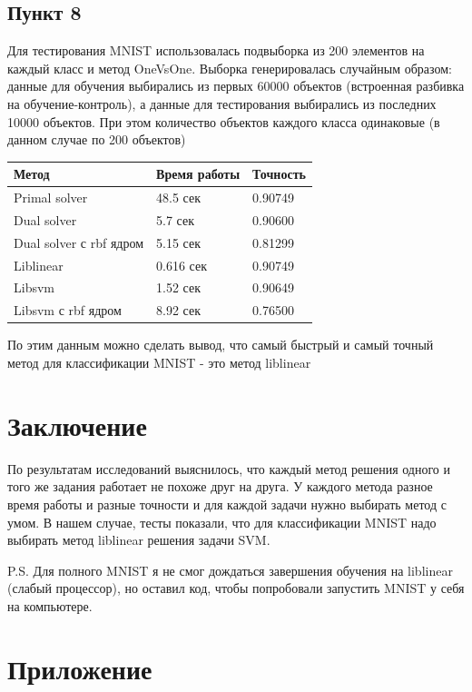 \documentclass[12pt, a4paper]{article}
\begin{document}
		\newpage
		\subsection{Пункт 8}
			Для тестирования MNIST использовалась подвыборка из 200 элементов на каждый класс и метод OneVsOne. Выборка генерировалась случайным образом: данные для обучения выбирались из первых 60000 объектов (встроенная разбивка на обучение-контроль), а данные для тестирования выбирались из последних 10000 объектов. При этом количество объектов каждого класса одинаковые (в данном случае по 200 объектов)

			\begin{center}
			\begin{tabular}{| l | l | l |}
				\hline
				Метод & Время работы & Точность \\
				\hline
				Primal solver & 48.5 сек & 0.90749 \\
				\hline
				Dual solver & 5.7 сек & 0.90600 \\
				\hline
				Dual solver с rbf ядром & 5.15 сек & 0.81299 \\
				\hline
				Liblinear & 0.616 сек & 0.90749 \\
				\hline
				Libsvm & 1.52 сек & 0.90649 \\
				\hline
				Libsvm с rbf ядром & 8.92 сек & 0.76500 \\
				\hline
			\end{tabular}
			\end{center}

			По этим данным можно сделать вывод, что самый быстрый и самый точный метод для классификации MNIST - это метод liblinear

	\newpage
	\section{Заключение}
		По результатам исследований выяснилось, что каждый метод решения одного и того же задания работает не похоже друг на друга. У каждого метода разное время работы и разные точности и для каждой задачи нужно выбирать метод с умом. В нашем случае, тесты показали, что для классификации MNIST надо выбирать метод liblinear решения задачи SVM.

		P.S. Для полного MNIST я не смог дождаться завершения обучения на liblinear (слабый процессор), но оставил код, чтобы попробовали запустить MNIST у себя на компьютере.

	\newpage
	\section{Приложение}
\end{document}
